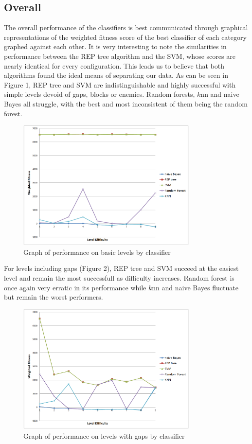 \documentclass[]{article}   %
\begin{document}
\subsection{Overall}

The overall performance of the classifiers is best communicated through graphical representations of the weighted fitness score of the best classifier
of each category graphed against each other. It is very interesting to note the similarities in performance between the REP tree algorithm and the SVM,
whose scores are nearly identical for every configuration. This leads us to believe that both algorithms found the ideal means of separating our data.
\newline\newline
As can be seen in Figure 1, REP tree and SVM are indistinguishable and highly successful with simple levels devoid of gaps, blocks or enemies. Random
forests, $k$nn and naive Bayes all struggle, with the best and most inconsistent of them being the random forest.
\begin{figure}[H]
\centering
\includegraphics[width=90mm]{basic.png}
\caption{Graph of performance on basic levels by classifier}
\end{figure}

For levels including gaps (Figure 2), REP tree and SVM succeed at the easiest level and remain the most successfull as difficulty increases. Random forest is once again
very erratic in its performance while $k$nn and naive Bayes fluctuate but remain the worst performers.
\begin{figure}[H]
\centering
\includegraphics[width=90mm]{gaps.png}
\caption{Graph of performance on levels with gaps by classifier}
\end{figure}
\end{document}
